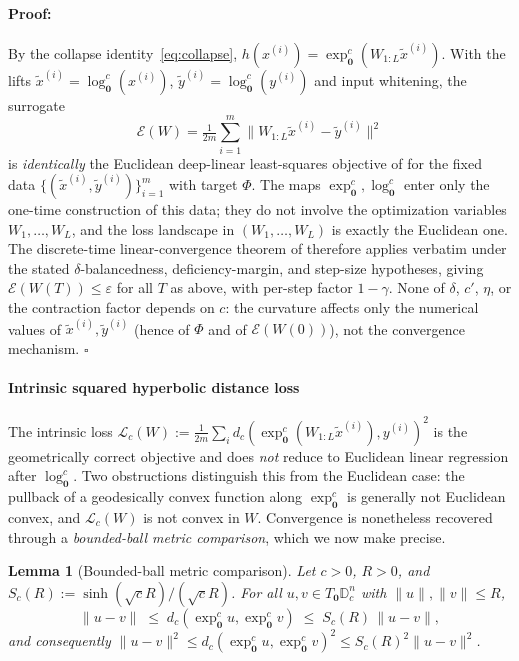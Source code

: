\documentclass[letterpaper]{article}
\newenvironment{proof}[1][Proof]{\paragraph{#1:}}{\hfill$\square$}
\newcommand{\D}{\mathbb{D}}      %
\newcommand{\exps}{\exp_{\mathbf{0}}^c}
\newcommand{\logs}{\log_{\mathbf{0}}^c}
\newtheorem{lemma}[theorem]{Lemma}
\begin{document}
\begin{proof}
By the collapse identity~\eqref{eq:collapse}, $h(x^{(i)})=\exps(W_{1:L}\tilde
x^{(i)})$. With the lifts $\tilde x^{(i)}=\logs(x^{(i)})$, $\tilde
y^{(i)}=\logs(y^{(i)})$ and input whitening, the surrogate
\[
\mathcal E(W)=\tfrac1{2m}\sum_{i=1}^m\|W_{1:L}\tilde x^{(i)}-\tilde y^{(i)}\|^2
\]
is \emph{identically} the Euclidean deep-linear least-squares objective of
\cite{arora2018convergence} for the fixed data $\{(\tilde x^{(i)},\tilde
y^{(i)})\}_{i=1}^m$ with target $\Phi$. The maps $\exps,\logs$ enter only the
one-time construction of this data; they do not involve the optimization
variables $W_1,\dots,W_L$, and the loss landscape in $(W_1,\dots,W_L)$ is
exactly the Euclidean one. The discrete-time linear-convergence theorem of
\cite{arora2018convergence} therefore applies verbatim under the stated
$\delta$-balancedness, deficiency-margin, and step-size hypotheses, giving
$\mathcal E(W(T))\le\varepsilon$ for all $T$ as above, with per-step factor
$1-\gamma$. None of $\delta$, $c'$, $\eta$, or the contraction
factor depends on $c$: the curvature affects only the numerical values of
$\tilde x^{(i)},\tilde y^{(i)}$ (hence of $\Phi$ and of $\mathcal E(W(0))$),
not the convergence mechanism.
\end{proof}


\paragraph{Intrinsic squared hyperbolic distance loss}
\label{sec:disc-intrinsic}

The intrinsic loss \(\mathcal L_c(W) := \tfrac{1}{2m} \sum_i d_c
(\exps(W_{1:L}\tilde x^{(i)}), y^{(i)})^2\) is the geometrically correct
objective and does \emph{not} reduce to Euclidean linear regression after
$\logs$. Two obstructions distinguish this from the Euclidean case: the
pullback of a geodesically convex function along $\exps$ is generally not
Euclidean convex, and \(\mathcal L_c(W)\) is not convex in \(W\).
Convergence is nonetheless recovered through a \emph{bounded-ball metric
comparison}, which we now make precise.

\begin{lemma}[Bounded-ball metric comparison]
\label{lem:bounded-ball}
Let $c>0$, $R>0$, and $S_c(R):=\sinh(\sqrt c R)/(\sqrt c R)$. For all
$u,v\in T_{\mathbf 0}\D_c^n$ with $\|u\|,\|v\|\le R$,
\begin{equation}
\label{eq:bounded-ball}
\|u-v\|\;\le\;d_c(\exps u,\exps v)\;\le\;S_c(R)\,\|u-v\|,
\end{equation}
and consequently $\|u-v\|^2\le d_c(\exps u,\exps v)^2\le S_c(R)^2\|u-v\|^2$.
\end{lemma}
\end{document}
